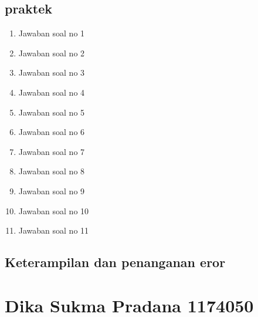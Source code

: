 \subsection{praktek}
\begin{enumerate}
    \item Jawaban soal no 1
    
    \item Jawaban soal no 2
    
    \item Jawaban soal no 3
    
    \item Jawaban soal no 4
    
    \item Jawaban soal no 5
    
    \item Jawaban soal no 6
    
    \item Jawaban soal no 7
    
    \item Jawaban soal no 8
    
    \item Jawaban soal no 9
    
    \item Jawaban soal no 10
    
    \item Jawaban soal no 11
    
\end{enumerate}

\subsection{Keterampilan dan penanganan eror}
    

\section{Dika Sukma Pradana 1174050}
